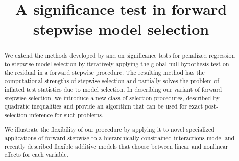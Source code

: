 \documentclass{imsart}
\begin{document}
\begin{frontmatter}

\title{A significance test in forward stepwise model selection}




\address{Department of Statistics\\  Stanford University\\ Sequoia
Hall \\390 Serra Mall\\ Stanford, CA 94305, U.S.A.\\ }


\begin{abstract}
  We extend the methods developed by \cite{significance:lasso} and
  \cite{tests:adaptive} on significance tests for penalized
  regression to stepwise model selection by iteratively applying
  the global null hypothesis test on the residual in a forward stepwise
  procedure. The resulting method
  has the computational strengths of stepwise selection and partially
  solves the problem of inflated test statistics due to model selection.
  In describing our variant of forward stepwise selection, we introduce
  a new class of selection procedures, described by quadratic inequalities and
  provide an algorithm that can be used for exact post-selection inference for such problems.
  
  We illustrate the flexibility of our procedure by applying it to
  novel specialized applications of forward stepwise to a hierarchically
  constrained interactions model and recently described flexible additive models
  that choose between linear and nonlinear effects for each variable.
\end{abstract}

\begin{keyword}[class=AMS]
\end{keyword}

\begin{keyword}
\end{keyword}

\end{frontmatter}
\end{document}
